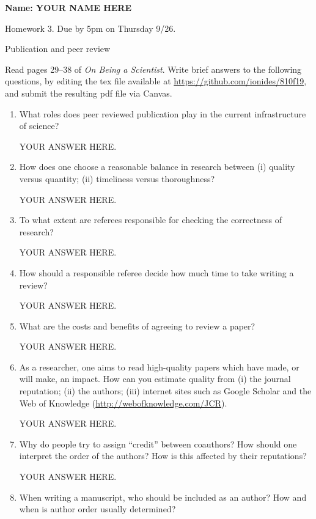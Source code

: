 \documentclass[12pt]{article}
\begin{document}
\begin{center}\bf
Name: YOUR NAME HERE

Homework 3. Due by 5pm on Thursday 9/26.

Publication and peer review

\end{center}

Read pages 29--38 of {\em On Being a Scientist}. Write brief answers to the following questions, by editing the tex file available at \url{https://github.com/ionides/810f19}, and submit the resulting pdf file via Canvas. 

\begin{enumerate}
\item What roles does peer reviewed publication play in the current infrastructure of science? 

YOUR ANSWER HERE.

\item How does one choose a reasonable balance in research between (i) quality versus quantity; (ii) timeliness versus thoroughness?

YOUR ANSWER HERE.

\item To what extent are referees responsible for checking the correctness of research? 

YOUR ANSWER HERE.

\item How should a responsible referee decide how much time to take writing a review? 

YOUR ANSWER HERE.

\item What are the costs and benefits of agreeing to review a paper?

YOUR ANSWER HERE.

\item As a researcher, one aims to read high-quality papers which have made, or will make, an impact. How can you estimate quality from (i) the journal reputation; (ii) the authors; (iii) internet sites such as Google Scholar and the Web of Knowledge (\url{http://webofknowledge.com/JCR}).

YOUR ANSWER HERE.

\item Why do people try to assign ``credit'' between coauthors? How should one interpret the order of the authors? How is this affected by their reputations? 

YOUR ANSWER HERE.

\item When writing a manuscript, who should be included as an author? How and when is author order usually determined? 


\end{enumerate}
\end{document}
